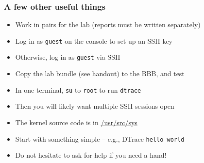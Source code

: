 \begin{frame}
  \frametitle{A few other useful things}

  \begin{itemize}
    \item Work in pairs for the lab (reports must be written separately)
    \item Log in as \texttt{guest} on the console to set up an SSH key
    \item Otherwise, log in as \texttt{guest} via SSH
    \item Copy the lab bundle (see handout) to the BBB, and test
    \item In one terminal, \texttt{su} to \texttt{root} to run \texttt{dtrace}
    \item Then you will likely want multiple SSH sessions open
    \item The kernel source code is in \url{/usr/src/sys}
    \item Start with something simple -- e.g., DTrace \texttt{hello world}
    \item Do not hesitate to ask for help if you need a hand!
  \end{itemize}
\end{frame}


